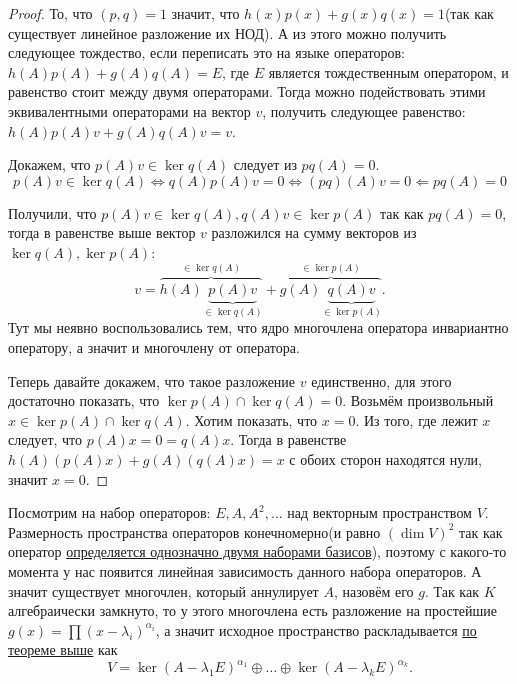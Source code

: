 \begin{proof}
    То, что $(p,q) = 1$ значит, что 
    $h(x)p(x) + g(x)q(x) = 1$(так как существует линейное разложение их НОД).
    А из этого можно получить следующее тождество, если переписать это на языке операторов:
    $h(A)p(A) + g(A) q(A) = E$, где $E$ является тождественным оператором, и равенство
    стоит между двумя операторами.
    Тогда можно подействовать этими эквивалентными операторами на вектор $v$, получить
    следующее равенство: $h(A)p(A)v + g(A)q(A)v = v$.

    Докажем, что $p(A)v\in \ker q(A)$ следует из $pq(A) = 0$.
    \[
        p(A)v\in \ker q(A) \Leftrightarrow q(A)p(A)v = 0 \Leftrightarrow (pq)(A)v = 0 \Leftarrow pq(A)=0
    \] 
    
    Получили, что $p(A)v\in \ker q(A), q(A)v\in \ker p(A)$ так как $pq(A)=0$,
    тогда в равенстве выше вектор $v$ разложился на сумму векторов из $\ker q(A), \ker p(A)$:
    \[
        v = 
        \overbrace{h(A)\underbrace{p(A)v}_{\in \ker q(A)}}^{\in \ker q(A)} + 
        \overbrace{g(A)\underbrace{q(A)v}_{\in \ker p(A)}}^{\in \ker p(A)}
    .\]
    Тут мы неявно
    воспользовались тем, что ядро многочлена оператора инвариантно оператору, а
    значит и многочлену от оператора.

    Теперь давайте докажем, что такое разложение $v$ единственно, для этого достаточно
    показать, что $\ker p(A) \cap \ker q(A) = 0$. Возьмём произвольный
    $x\in \ker p(A)\cap \ker q(A)$. Хотим показать, что $x = 0$.
    Из того, где лежит  $x$ следует, что $p(A)x = 0 = q(A)x$.
    Тогда в равенстве $h(A)(p(A)x) + g(A)(q(A)x) = x$ с обоих сторон находятся нули, 
    значит $x = 0$.
\end{proof}
\begin{follow}
    Посмотрим на набор операторов: $E, A, A^2, \dots$ над векторным пространством $V$.
    Размерность пространства операторов конечномерно(и равно $(\dim V)^2$ так как
    оператор \hyperref[thm:Линейное отображение определяется действием на базисных векторах]
    {определяется однозначно двумя наборами базисов}), поэтому
    с какого-то момента у нас появится линейная зависимость данного набора операторов.
    А значит существует многочлен, который аннулирует $A$, назовём его $g$.
    Так как $K$ алгебраически замкнуто, то у этого многочлена есть разложение на простейшие
    $g(x) = \prod (x - \lambda_i)^{\alpha_i}$, а значит исходное пространство раскладывается 
    \hyperref[thm:О аннулирующем операторе]{по теореме выше} как 
    \[
        V = \ker (A - \lambda_1 E)^{\alpha_1} \oplus \dots \oplus \ker (A - \lambda_k E)^{\alpha_k}
    .\]
\end{follow}
